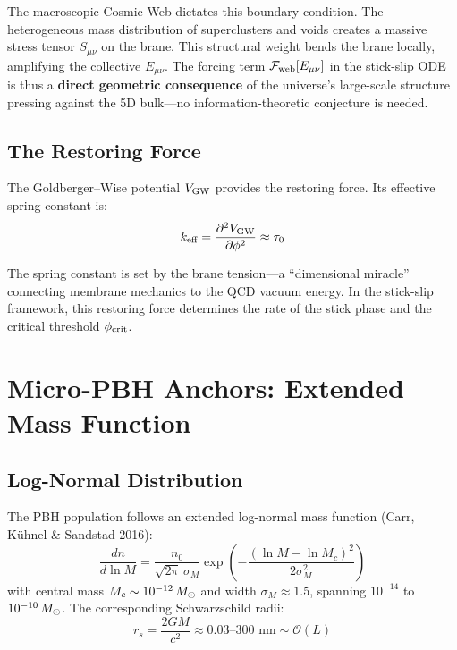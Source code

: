 The macroscopic Cosmic Web dictates this boundary condition. The heterogeneous mass distribution of superclusters and voids creates a massive stress tensor $S_{\mu\nu}$ on the brane. This structural weight bends the brane locally, amplifying the collective $E_{\mu\nu}$. The forcing term $\mathcal{F}_\text{web}[E_{\mu\nu}]$ in the stick-slip ODE is thus a \textbf{direct geometric consequence} of the universe's large-scale structure pressing against the 5D bulk---no information-theoretic conjecture is needed.

\subsection{The Restoring Force}

The Goldberger--Wise potential $V_\text{GW}$ provides the restoring force. Its effective spring constant is:
\begin{equation}
k_\text{eff} = \frac{\partial^2 V_\text{GW}}{\partial\phi^2} \approx \tau_0
\end{equation}

The spring constant is set by the brane tension---a ``dimensional miracle'' connecting membrane mechanics to the QCD vacuum energy. In the stick-slip framework, this restoring force determines the rate of the stick phase and the critical threshold $\phi_\text{crit}$.

\section{Micro-PBH Anchors: Extended Mass Function}
\label{sec:pbh_anchors}

\subsection{Log-Normal Distribution}

The PBH population follows an extended log-normal mass function (Carr, K\"uhnel \& Sandstad 2016):
\begin{equation}
\frac{dn}{d\ln M} = \frac{n_0}{\sqrt{2\pi}\,\sigma_M}\exp\!\left(-\frac{(\ln M - \ln M_c)^2}{2\sigma_M^2}\right)
\end{equation}
with central mass $M_c \sim 10^{-12}\,M_\odot$ and width $\sigma_M \approx 1.5$, spanning $10^{-14}$ to $10^{-10}\,M_\odot$. The corresponding Schwarzschild radii:
\begin{equation}
r_s = \frac{2GM}{c^2} \approx 0.03\text{--}300\text{ nm} \sim \mathcal{O}(L)
\end{equation}

